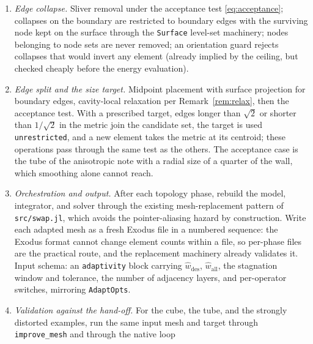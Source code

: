 \documentclass[11pt]{article}
\newcommand{\code}[1]{\texttt{#1}}
\newcommand{\omegah}{Omega\_h}
\begin{document}
\begin{enumerate}[itemsep=3pt]
  Implement the three-dimensional edge swap: extract the loop of
  elements around an edge (at most seven, following \omegah{}),
  enumerate the tabulated triangulations of the surrounding polygon,
  and select the best; implement the single acceptance routine
  \eqref{eq:acceptance}; wire the outer driver (smoothing phase, candidate
  collection, swap passes, repeat). Swaps move no nodes and need no
  state transfer, so this milestone alone should reproduce most of the
  observed benefit of the alternation.
\item \emph{Edge collapse.} Sliver removal under the acceptance test
  \eqref{eq:acceptance}; collapses on the boundary are restricted to
  boundary edges with the surviving node kept on the surface through
  the \code{Surface} level-set machinery; nodes belonging to node sets
  are never removed; an orientation guard rejects collapses that would
  invert any element (already implied by the ceiling, but checked
  cheaply before the energy evaluation).
\item \emph{Edge split and the size target.} Midpoint placement with
  surface projection for boundary edges, cavity-local relaxation per
  Remark~\ref{rem:relax}, then the acceptance test. With a prescribed target,
  edges longer than $\sqrt2$ or shorter than $1/\sqrt2$ in the metric
  join the candidate set, the target is used \code{unrestricted}, and a
  new element takes the metric at its centroid; these operations pass
  through the same test as the others. The acceptance case is the tube
  of the anisotropic note with a radial size of a quarter of the wall,
  which smoothing alone cannot reach.
\item \emph{Orchestration and output.} After each topology phase,
  rebuild the model, integrator, and solver through the existing
  mesh-replacement pattern of \code{src/swap.jl}, which avoids the
  pointer-aliasing hazard by construction. Write each adapted mesh as a
  fresh Exodus file in a numbered sequence: the Exodus format cannot
  change element counts within a file, so per-phase files are the
  practical route, and the replacement machinery already validates it.
  Input schema: an \code{adaptivity} block carrying
  $\hat{w}_{\text{des}}$, $\hat{w}_{\text{all}}$, the stagnation window
  and tolerance, the number of adjacency layers, and per-operator
  switches, mirroring \code{AdaptOpts}.
\item \emph{Validation against the hand-off.} For the cube, the
  tube, and the strongly distorted examples, run the same input mesh
  and target through \code{improve\_mesh} and through the native loop

\end{enumerate}
\end{document}
